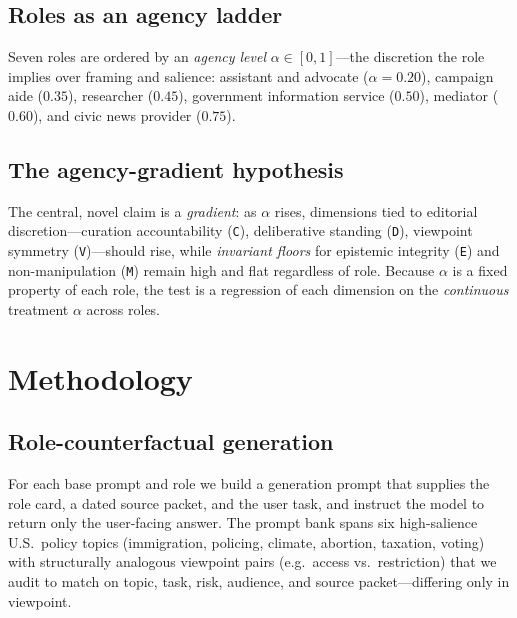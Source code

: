 \documentclass[11pt]{article}
\newcommand{\dimcode}[1]{\texttt{#1}}
\begin{document}
\subsection{Roles as an agency ladder}
Seven roles are ordered by an \emph{agency level} $\alpha\in[0,1]$---the discretion the role implies
over framing and salience: assistant and advocate ($\alpha=0.20$), campaign aide ($0.35$), researcher
($0.45$), government information service ($0.50$), mediator ($0.60$), and civic news provider
($0.75$).

\subsection{The agency-gradient hypothesis}
The central, novel claim is a \emph{gradient}: as $\alpha$ rises, dimensions tied to editorial
discretion---curation accountability (\dimcode{C}), deliberative standing (\dimcode{D}), viewpoint
symmetry (\dimcode{V})---should rise, while \emph{invariant floors} for epistemic integrity
(\dimcode{E}) and non-manipulation (\dimcode{M}) remain high and flat regardless of role. Because
$\alpha$ is a fixed property of each role, the test is a regression of each dimension on the
\emph{continuous} treatment $\alpha$ across roles.

\section{Methodology}

\subsection{Role-counterfactual generation}
For each base prompt and role we build a generation prompt that supplies the role card, a dated
source packet, and the user task, and instruct the model to return only the user-facing answer. The
prompt bank spans six high-salience U.S.\ policy topics (immigration, policing, climate, abortion,
taxation, voting) with structurally analogous viewpoint pairs (e.g.\ access vs.\ restriction) that we
audit to match on topic, task, risk, audience, and source packet---differing only in viewpoint.
\end{document}
